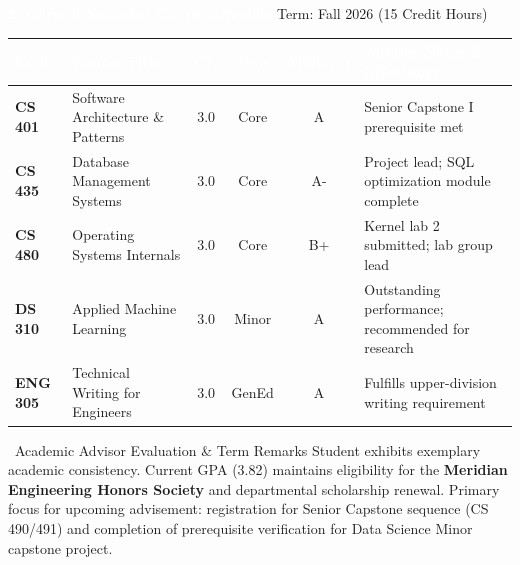 \documentclass[10pt,a4paper]{article}
\newcommand{\sectiontitle}[2]{%
  \vspace{4pt}%
  \begin{tcolorbox}[
    enhanced,
    colback=NavyPrimary,
    colframe=NavyPrimary,
    arc=3pt,
    top=3.5pt, bottom=3.5pt, left=8pt, right=8pt,
    boxrule=0pt
  ]
    \textcolor{white}{\textbf{\large #1}} \hfill \textcolor{TealAccent!40}{\small #2}
  \end{tcolorbox}%
  \vspace{-2pt}%
}
\begin{document}
\vspace{3pt}

\sectiontitle{2. Current Semester Course Schedule}{Term: Fall 2026 (15 Credit Hours)}

\vspace{1pt}

\begin{tabularx}{\textwidth}{@{} l L c c c L @{}}
  \toprule
  \textcolor{white}{\textbf{Code}} & \textcolor{white}{\textbf{Course Title}} & \textcolor{white}{\textbf{Cr.}} & \textcolor{white}{\textbf{Type}} & \textcolor{white}{\textbf{Midterm}} & \textcolor{white}{\textbf{Advisor Notes \& Milestones}} \\
  \midrule
  \textbf{CS 401} & Software Architecture \& Patterns & 3.0 & Core & A & Senior Capstone I prerequisite met \\
  \textbf{CS 435} & Database Management Systems & 3.0 & Core & A- & Project lead; SQL optimization module complete \\
  \textbf{CS 480} & Operating Systems Internals & 3.0 & Core & B+ & Kernel lab 2 submitted; lab group lead \\
  \textbf{DS 310} & Applied Machine Learning & 3.0 & Minor & A & Outstanding performance; recommended for research \\
  \textbf{ENG 305} & Technical Writing for Engineers & 3.0 & GenEd & A & Fulfills upper-division writing requirement \\
  \bottomrule
\end{tabularx}

\vspace{4pt}

\begin{alertbox}[BlueAccent]{\faCommentDots\ Academic Advisor Evaluation \& Term Remarks}
  Student exhibits exemplary academic consistency. Current GPA (3.82) maintains eligibility for the \textbf{Meridian Engineering Honors Society} and departmental scholarship renewal. Primary focus for upcoming advisement: registration for Senior Capstone sequence (CS 490/491) and completion of prerequisite verification for Data Science Minor capstone project.
\end{alertbox}

\newpage

\end{document}
